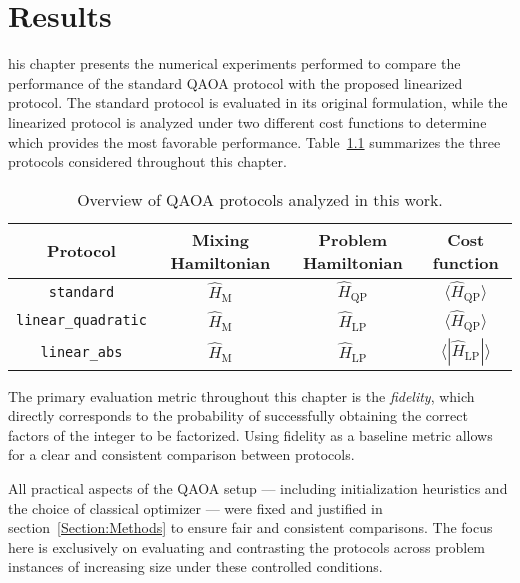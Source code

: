 \chapter{Results}
\label{Chapter:Results}

his chapter presents the numerical experiments performed to compare the performance
of the standard QAOA protocol with the proposed linearized protocol. The standard protocol is
evaluated in its original formulation, while the linearized protocol is analyzed under two different
cost functions to determine which provides the most favorable performance. Table~\ref{tab:protocols_overview}
summarizes the three protocols considered throughout this chapter. 

\begin{table}[h]
    \centering
    \begin{tabular}{@{}cccc@{}}
        \toprule
        Protocol            & Mixing Hamiltonian    & Problem Hamiltonian   & Cost function \\
        \midrule
        \texttt{standard}            & $\hat{H}_\mathrm{M}$   & $\hat{H}_\mathrm{QP}$ & $\langle \hat{H}_\mathrm{QP} \rangle$ \\
        \texttt{linear\_quadratic}   & $\hat{H}_\mathrm{M}$   & $\hat{H}_\mathrm{LP}$ & $\langle \hat{H}_\mathrm{QP} \rangle$ \\
        \texttt{linear\_abs}         & $\hat{H}_\mathrm{M}$   & $\hat{H}_\mathrm{LP}$ & $\langle |\hat{H}_\mathrm{LP}| \rangle$ \\
        \bottomrule
    \end{tabular}
    \caption{Overview of QAOA protocols analyzed in this work.}
    \label{tab:protocols_overview}
\end{table}

The primary evaluation metric throughout this chapter is the \emph{fidelity}, which directly
corresponds to the probability of successfully obtaining the correct factors of the integer
to be factorized. Using fidelity as a baseline metric allows for a clear and consistent
comparison between protocols.

All practical aspects of the QAOA setup --- including initialization heuristics and the choice of
classical optimizer --- were fixed and justified in section~\ref{Section:Methods} to ensure
fair and consistent comparisons. The focus here is exclusively on evaluating and contrasting
the protocols across problem instances of increasing size under these controlled conditions.

